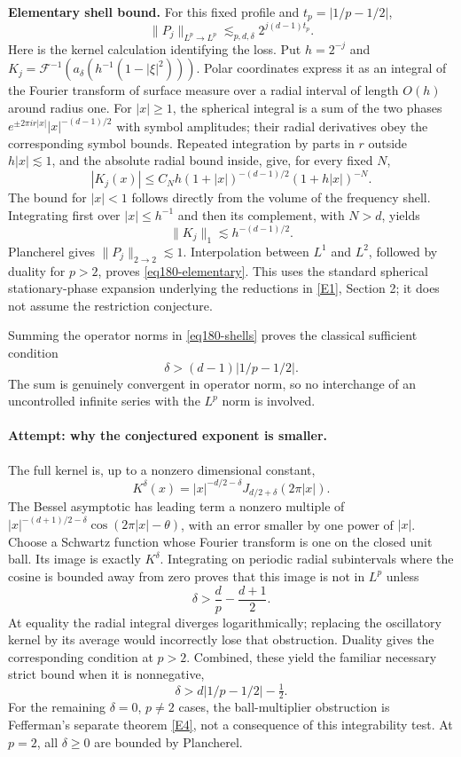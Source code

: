 \documentclass[11pt,a4paper]{article}
\newcommand{\eref}[2]{\hyperlink{extra:#1:#2}{[E#2]}}
\numberwithin{equation}{section}
\begin{document}
\textbf{Elementary shell bound.} For this fixed profile and
$t_p=|1/p-1/2|$,
\begin{equation}\label{eq180-elementary}
        \|P_j\|_{L^p\to L^p}\lesssim_{p,d,\delta}
                          2^{j(d-1)t_p}.
\end{equation}
Here is the kernel calculation identifying the loss. Put $h=2^{-j}$ and
$K_j=\mathcal F^{-1}(a_\delta(h^{-1}(1-|\xi|^2)))$. Polar coordinates
express it as an integral of the Fourier transform of surface measure
over a radial interval of length $O(h)$ around radius one. For $|x|\ge1$,
the spherical integral is a sum of the two phases
$e^{\pm2\pi i r|x|}|x|^{-(d-1)/2}$ with symbol amplitudes; their radial
derivatives obey the corresponding symbol bounds. Repeated integration
by parts in $r$ outside $h|x|\lesssim1$, and the absolute radial bound
inside, give, for every fixed $N$,
\[
 |K_j(x)|\le C_N h(1+|x|)^{-(d-1)/2}(1+h|x|)^{-N}.
\]
The bound for $|x|<1$ follows directly from the volume of the frequency
shell. Integrating first over $|x|\le h^{-1}$ and then its complement,
with $N>d$, yields
\[
        \|K_j\|_1\lesssim h^{-(d-1)/2}.
\]
Plancherel gives $\|P_j\|_{2\to2}\lesssim1$. Interpolation between
$L^1$ and $L^2$, followed by duality for $p>2$, proves
\eqref{eq180-elementary}. This uses the standard spherical
stationary-phase expansion underlying the reductions in
\eref{30006774}{1}, Section 2; it does not assume the restriction conjecture.

Summing the operator norms in \eqref{eq180-shells} proves the classical
sufficient condition
\begin{equation}\label{eq180-classical}
                     \delta>(d-1)|1/p-1/2|.
\end{equation}
The sum is genuinely convergent in operator norm, so no interchange of an
uncontrolled infinite series with the $L^p$ norm is involved.

\paragraph{Attempt: why the conjectured exponent is smaller.}
The full kernel is, up to a nonzero dimensional constant,
\[
 K^\delta(x)=|x|^{-d/2-\delta}
                         J_{d/2+\delta}(2\pi|x|).
\]
The Bessel asymptotic has leading term a nonzero multiple of
$|x|^{-(d+1)/2-\delta}\cos(2\pi|x|-\theta)$, with an error smaller by
one power of $|x|$. Choose a Schwartz function whose Fourier transform is
one on the closed unit ball. Its image is exactly $K^\delta$. Integrating
on periodic radial subintervals where the cosine is bounded away from
zero proves that this image is not in $L^p$ unless
\[
             \delta>\frac d p-\frac{d+1}{2}.
\]
At equality the radial integral diverges logarithmically; replacing the
oscillatory kernel by its average would incorrectly lose that obstruction.
Duality gives the corresponding condition at $p>2$. Combined, these yield
the familiar necessary strict bound when it is nonnegative,
\[
                 \delta>d|1/p-1/2|-\tfrac12.
\]
For the remaining $\delta=0$, $p\ne2$ cases, the ball-multiplier obstruction
is Fefferman's separate theorem \eref{30006774}{4}, not a consequence of this
integrability test. At $p=2$, all $\delta\ge0$ are bounded by Plancherel.
\end{document}
